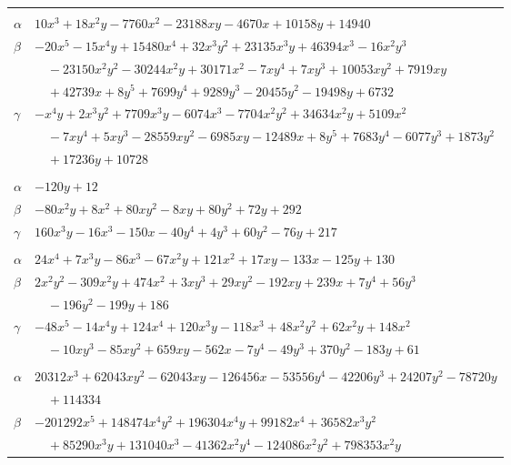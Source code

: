 \documentclass[11pt]{article}
\begin{document}
\begin{longtable}{@{}ll@{}}
\addlinespace[3pt]
\multicolumn{2}{@{}l}{$\{i,j\}=\{10,25\}$, $k_{ij}=2^{3}\cdot 3^{2}\cdot 5\cdot 7$}\\
$\alpha$ & $10x^{3}+18x^{2}y-7760x^{2}-23188xy-4670x+10158y+14940$\\
$\beta$ & $-20x^{5}-15x^{4}y+15480x^{4}+32x^{3}y^{2}+23135x^{3}y+46394x^{3}-16x^{2}y^{3}$\\
 & $\quad -23150x^{2}y^{2}-30244x^{2}y+30171x^{2}-7xy^{4}+7xy^{3}+10053xy^{2}+7919xy$\\
 & $\quad +42739x+8y^{5}+7699y^{4}+9289y^{3}-20455y^{2}-19498y+6732$\\
$\gamma$ & $-x^{4}y+2x^{3}y^{2}+7709x^{3}y-6074x^{3}-7704x^{2}y^{2}+34634x^{2}y+5109x^{2}$\\
 & $\quad -7xy^{4}+5xy^{3}-28559xy^{2}-6985xy-12489x+8y^{5}+7683y^{4}-6077y^{3}+1873y^{2}$\\
 & $\quad +17236y+10728$\\
\addlinespace[3pt]
\multicolumn{2}{@{}l}{$\{i,j\}=\{10,30\}$, $k_{ij}=3^{2}\cdot 7$}\\
$\alpha$ & $-120y+12$\\
$\beta$ & $-80x^{2}y+8x^{2}+80xy^{2}-8xy+80y^{2}+72y+292$\\
$\gamma$ & $160x^{3}y-16x^{3}-150x-40y^{4}+4y^{3}+60y^{2}-76y+217$\\
\addlinespace[3pt]
\multicolumn{2}{@{}l}{$\{i,j\}=\{10,38\}$, $k_{ij}=2^{3}\cdot 7$}\\
$\alpha$ & $24x^{4}+7x^{3}y-86x^{3}-67x^{2}y+121x^{2}+17xy-133x-125y+130$\\
$\beta$ & $2x^{2}y^{2}-309x^{2}y+474x^{2}+3xy^{3}+29xy^{2}-192xy+239x+7y^{4}+56y^{3}$\\
 & $\quad -196y^{2}-199y+186$\\
$\gamma$ & $-48x^{5}-14x^{4}y+124x^{4}+120x^{3}y-118x^{3}+48x^{2}y^{2}+62x^{2}y+148x^{2}$\\
 & $\quad -10xy^{3}-85xy^{2}+659xy-562x-7y^{4}-49y^{3}+370y^{2}-183y+61$\\
\addlinespace[3pt]
\multicolumn{2}{@{}l}{$\{i,j\}=\{10,46\}$, $k_{ij}=2\cdot 3^{2}\cdot 5\cdot 7\cdot 13$}\\
$\alpha$ & $20312x^{3}+62043xy^{2}-62043xy-126456x-53556y^{4}-42206y^{3}+24207y^{2}-78720y$\\
 & $\quad +114334$\\
$\beta$ & $-201292x^{5}+148474x^{4}y^{2}+196304x^{4}y+99182x^{4}+36582x^{3}y^{2}$\\
 & $\quad +85290x^{3}y+131040x^{3}-41362x^{2}y^{4}-124086x^{2}y^{2}+798353x^{2}y$\\

\end{longtable}
\end{document}
